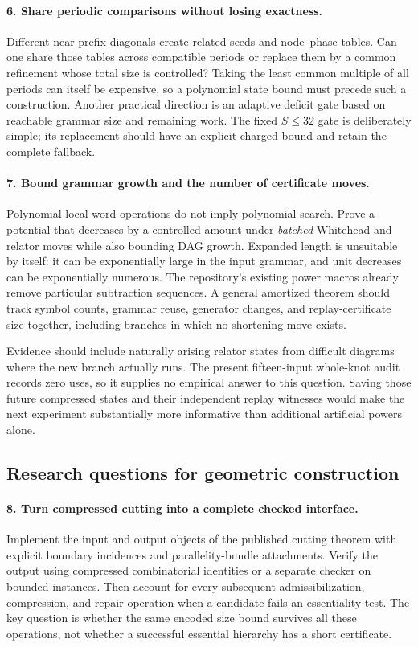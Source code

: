 \documentclass[11pt]{article}
\theoremstyle{definition}
\theoremstyle{remark}
\begin{document}
\paragraph{6. Share periodic comparisons without losing exactness.}
Different near-prefix diagonals create related seeds and node--phase
tables. Can one share those tables across compatible periods or replace
them by a common refinement whose total size is controlled? Taking the
least common multiple of all periods can itself be expensive, so a
polynomial state bound must precede such a construction. Another
practical direction is an adaptive deficit gate based on reachable
grammar size and remaining work. The fixed $S\le32$ gate is deliberately
simple; its replacement should have an explicit charged bound and retain
the complete fallback.

\paragraph{7. Bound grammar growth and the number of certificate moves.}
Polynomial local word operations do not imply polynomial search. Prove
a potential that decreases by a controlled amount under \emph{batched}
Whitehead and relator moves while also bounding DAG growth. Expanded
length is unsuitable by itself: it can be exponentially large in the
input grammar, and unit decreases can be exponentially numerous.
The repository's existing power macros already remove particular
subtraction sequences. A general amortized theorem should track
symbol counts, grammar reuse, generator changes, and replay-certificate
size together, including branches in which no shortening move exists.

Evidence should include naturally arising relator states from difficult
diagrams where the new branch actually runs. The present fifteen-input
whole-knot audit records zero uses, so it supplies no empirical answer
to this question. Saving those future compressed states and their
independent replay witnesses would make the next experiment substantially
more informative than additional artificial powers alone.

\subsection{Research questions for geometric construction}

\paragraph{8. Turn compressed cutting into a complete checked interface.}
Implement the input and output objects of the published cutting theorem
with explicit boundary incidences and parallelity-bundle attachments.
Verify the output using compressed combinatorial identities or a separate
checker on bounded instances. Then account for every subsequent
admissibilization, compression, and repair operation when a candidate
fails an essentiality test. The key question is whether the same encoded
size bound survives all these operations, not whether a successful
essential hierarchy has a short certificate.
\end{document}
